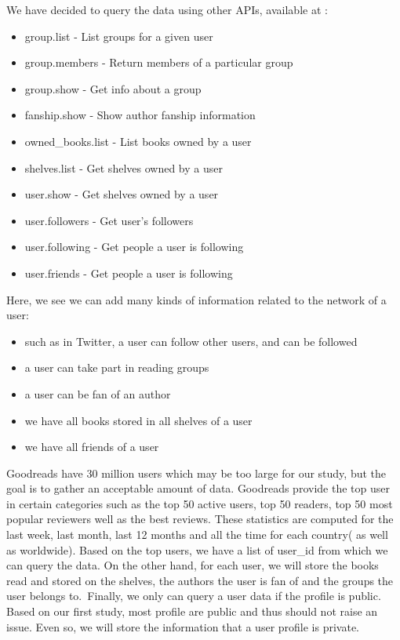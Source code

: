 \documentclass[11pt]{article}
\begin{document}
We have decided to query the data using other APIs, available at \cite{goodreads:api}:
\begin{itemize}
\item group.list - List groups for a given user
\item group.members - Return members of a particular group
\item group.show - Get info about a group
\item fanship.show - Show author fanship information
\item owned\_books.list - List books owned by a user
\item shelves.list - Get shelves owned by a user
\item user.show - Get shelves owned by a user
\item user.followers - Get user's followers
\item user.following - Get people a user is following
\item user.friends - Get people a user is following
\end{itemize}

Here, we see we can add many kinds of information related to the network of a user:
\begin{itemize}
\item such as in Twitter, a user can follow other users, and can be followed
\item a user can take part in reading groups
\item a user can be fan of an author
\item we have all books stored in all shelves of a user
\item we have all friends of a user
\end{itemize}

Goodreads have 30 million users which may be too large for our study, but the goal is to gather an acceptable amount of data. Goodreads provide the top user in certain categories such as the top 50 active users, top 50 readers, top 50 most popular reviewers well as the best reviews. These statistics are computed for the last week, last month, last 12 months and all the time for each country( as well as worldwide).
Based on the top users, we have a list of user\_id from which we can query the data. On the other hand, for each user, we will store the books read and stored on the shelves, the authors the user is fan of and the groups the user belongs to.\
Finally, we only can query a user data if the profile is public. Based on our first study, most profile are public and thus should not raise an issue. Even so, we will store the information that a user profile is private.
\end{document}
